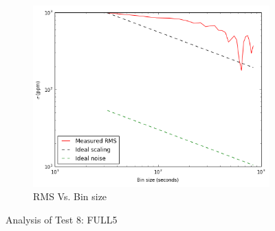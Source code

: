 \documentclass[conference]{IEEEtran}
\begin{document}
\begin{figure}[H]
    \begin{subfigure}{3}
        \includegraphics[scale=0.6]{rms_test8}
        \caption{RMS Vs. Bin size}
    \end{subfigure}
    \caption{Analysis of Test 8: FULL5}
\end{figure}
\end{document}
